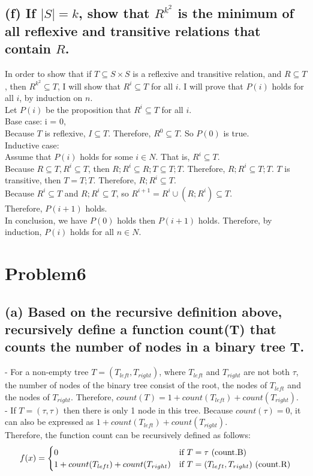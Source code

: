 \documentclass[]{article}
\begin{document}
\begin{spacing}{1.5}
		\subsection*{(f) If $ |S| = k $, show that $ R^{k^2}$ is the minimum of all reflexive and transitive relations that contain $ R $.}		
		In order to show that if $ T \subseteq S \times S $ is a reflexive and transitive relation, and $ R \subseteq T $, then $ R^{k^2} \subseteq T$, I will show that  $ R^i \subseteq T $ for all $ i $. I will prove that $ P(i) $ holds for all $ i $, by induction on $ n $.\\
		Let  $ P(i) $ be the proposition that $ R^i \subseteq T $ for all $ i $.\\
		Base case: i = 0,\\
		Because $ T $ is reflexive, $ I \subseteq T$. Therefore, $ R^0 \subseteq T $. So $ P(0)$ is true.\\
		Inductive case:\\
		Assume that $ P(i) $ holds for some $ i \in N $. That is, $ R^i \subseteq T $.\\
		Because $ R \subseteq T, R^i \subseteq T $, then $ R; R^i \subseteq R; T \subseteq T; T$. Therefore, $ R; R^i \subseteq T; T$. $ T $ is transitive, then $ T = T; T $. Therefore, $ R; R^i \subseteq T$.\\
		Because $ R^i \subseteq T $ and $ R; R^i \subseteq T$, so $ R^{i+1} = R^i \cup (R; R^i) \subseteq T$.	\\
		Therefore, $ P(i+1) $ holds.\\
		In conclusion, we have $ P(0) $ holds then $ P(i+1) $ holds. Therefore, by induction, $ P(i) $ holds for all $ n \in N $.
	
		\section*{Problem6}
		\subsection*{(a) Based on the recursive definition above, recursively define a function count(T) that counts the number of nodes in a binary tree T.}
		- For a non-empty tree $ T = (T_{left}, T_{right}) $, where $ T_{left} $ and $ T_{right} $ are not both $ \tau $, the number of nodes of the binary tree consist of the root, the nodes of $ T_{left} $ and the nodes of $ T_{right} $. Therefore, $ count(T) = 1 + count(T_{left}) + count(T_{right}) $.\\
		- If $ T = (\tau, \tau) $ then there is only 1 node in this tree. Because $ count(\tau) = 0 $, it can also be expressed as  $ 1 + count(T_{left}) + count(T_{right}) $.\\
		Therefore, the function count can be recursively defined as follows:
		$$f(x)=
		\begin{cases}
			0& \text{if $ T = \tau $  (count.B)}\\
			1+count(T_{left})+count(T_{right})& \text{if $ T=(T_{left}, T_{right}) $  (count.R)}
		\end{cases}$$
	

\end{spacing}
\end{document}
